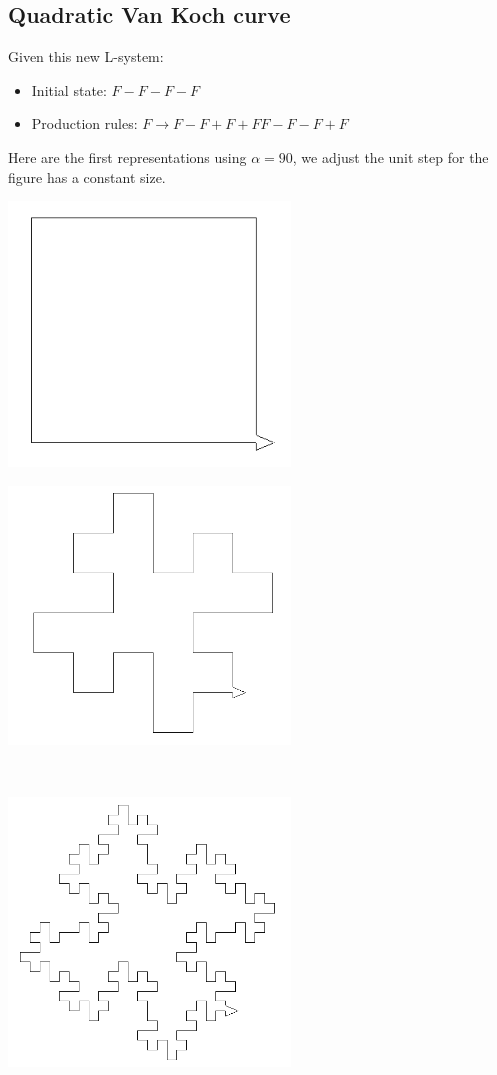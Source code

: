 \subsection{Quadratic Van Koch curve}
\noindent Given this new L-system:
\begin{itemize}
 \item[\textbullet] Initial state: $F-F-F-F$
 \item[\textbullet] Production rules: $F\rightarrow F-F+F+FF-F-F+F$
\end{itemize}
Here are the first representations using $\alpha=90$, we adjust the unit step for the figure has a constant size.
\begin{center}
\begin{minipage}{7.5cm}
 \includegraphics[width=7.5cm]{pics/linden-koch1.png}
\end{minipage}
\begin{minipage}{7.5cm}
 \includegraphics[width=7.5cm]{pics/linden-koch2.png}
\end{minipage}\\
\begin{minipage}{7.5cm}
 \includegraphics[width=7.5cm]{pics/linden-koch3.png}

\end{minipage}
\end{center}
